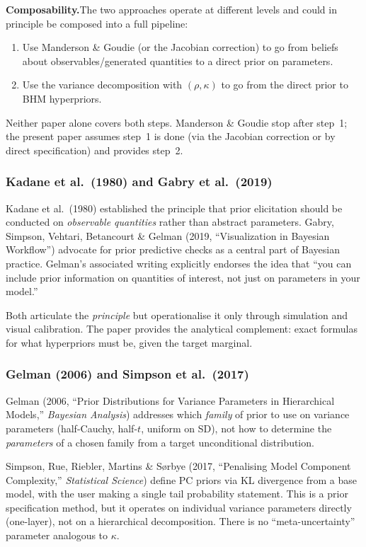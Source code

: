 \documentclass[12pt,a4paper]{article}
\begin{document}
\medskip
\noindent\textbf{Composability.}\quad The two approaches operate at different
levels and could in principle be composed into a full pipeline:
\begin{enumerate}
  \item Use Manderson \& Goudie (or the Jacobian correction) to go from beliefs
    about observables/generated quantities to a direct prior on parameters.
  \item Use the variance decomposition with $(\rho, \kappa)$ to go from the
    direct prior to BHM hyperpriors.
\end{enumerate}
Neither paper alone covers both steps. Manderson \& Goudie stop after step~1;
the present paper assumes step~1 is done (via the Jacobian correction or by
direct specification) and provides step~2.

\subsubsection{Kadane et al.\ (1980) and Gabry et al.\ (2019)}

Kadane et al.\ (1980) established the principle that prior elicitation should
be conducted on \emph{observable quantities} rather than abstract parameters.
Gabry, Simpson, Vehtari, Betancourt \& Gelman (2019, ``Visualization in
Bayesian Workflow'') advocate for prior predictive checks as a central part of
Bayesian practice. Gelman's associated writing explicitly endorses the idea that
``you can include prior information on quantities of interest, not just on
parameters in your model.''

Both articulate the \emph{principle} but operationalise it only through
simulation and visual calibration. The paper provides the analytical complement:
exact formulas for what hyperpriors must be, given the target marginal.

\subsubsection{Gelman (2006) and Simpson et al.\ (2017)}

Gelman (2006, ``Prior Distributions for Variance Parameters in Hierarchical
Models,'' \emph{Bayesian Analysis}) addresses which \emph{family} of prior to
use on variance parameters (half-Cauchy, half-$t$, uniform on SD), not how to
determine the \emph{parameters} of a chosen family from a target unconditional
distribution.

Simpson, Rue, Riebler, Martins \& S{\o}rbye (2017, ``Penalising Model
Component Complexity,'' \emph{Statistical Science}) define PC priors via KL
divergence from a base model, with the user making a single tail probability
statement. This is a prior specification method, but it operates on individual
variance parameters directly (one-layer), not on a hierarchical decomposition.
There is no ``meta-uncertainty'' parameter analogous to $\kappa$.
\end{document}
